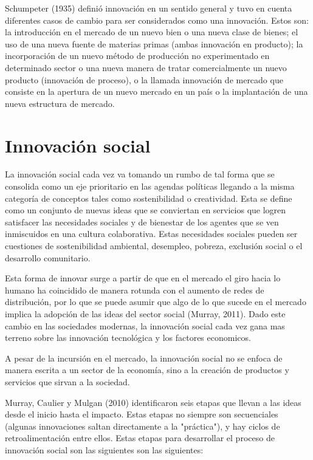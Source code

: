 \documentclass{memoir}
\begin{document}
Schumpeter  (1935)  definió  innovación  en  un  sentido  general  y  tuvo  en  cuenta  diferentes  casos  de  cambio  para  ser  considerados  como  una  innovación.  Estos  son:  la  introducción  en  el  mercado  de  un  nuevo  bien  o  una  nueva  clase  de  bienes;  el  uso  de  una  nueva  fuente  de  materias  primas  (ambas  innovación  en  producto);  la  incorporación  de  un  nuevo  método  de  producción  no  experimentado    en    determinado    sector    o    una    nueva    manera    de    tratar comercialmente   un   nuevo   producto   (innovación   de   proceso),   o   la   llamada innovación  de  mercado  que  consiste  en  la  apertura  de  un  nuevo  mercado  en  un  país o la implantación de una nueva estructura de mercado.


\section{Innovación social}
\label{sec:orgb2dcfa1}

La innovación social cada vez va tomando un rumbo de tal forma que se consolida como un eje prioritario en las agendas políticas llegando a la misma categoría de conceptos tales como sostenibilidad  o creatividad. Esta se define como un conjunto de nuevas ideas que se conviertan en servicios que logren satisfacer las necesidades sociales y de bienestar de los agentes que se ven inmiscuidos en una cultura colaborativa. Estas necesidades sociales pueden ser cuestiones de sostenibilidad ambiental, desempleo, pobreza, exclusión social o el desarrollo comunitario.

Esta forma de innovar surge a partir de que en el mercado el giro hacia lo humano ha coincidido de manera rotunda con el aumento de redes de distribución, por lo que se puede asumir que algo de lo que sucede en el mercado implica la adopción de las ideas del sector social (Murray, 2011). Dado este cambio en las sociedades modernas, la innovación social cada vez gana mas terreno sobre las innovación tecnológica y los factores economicos.

A pesar de la incursión en el mercado, la innovación social no se enfoca de manera escrita a un sector de la economía,  sino a la creación de productos y servicios que sirvan a la sociedad.

Murray,  Caulier  y  Mulgan  (2010)  identificaron  seis  etapas  que  llevan  a  las  ideas desde el inicio hasta el impacto. Estas etapas no siempre son secuenciales (algunas innovaciones saltan directamente a la "práctica"), y hay ciclos de retroalimentación entre  ellos. Estas etapas para desarrollar el proceso de innovación social son las siguientes son las siguientes:
\end{document}
